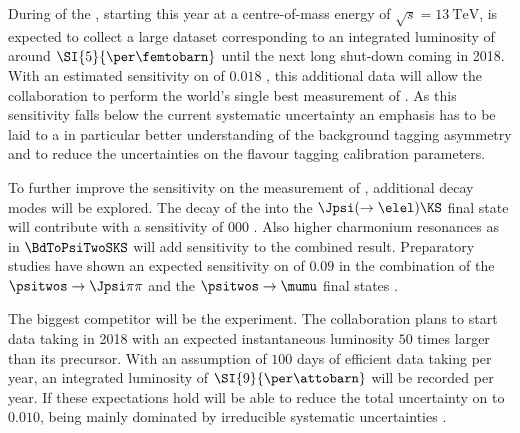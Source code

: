 During \RunTwo of the \LHC, starting this year at a centre-of-mass energy of
$\sqrt{s} = \SI{13}{\TeV}$, \LHCb is expected to collect a large dataset
corresponding to an integrated luminosity of around $\SI{5}{\per\femtobarn}$
until the next long shut-down coming in 2018. With an estimated sensitivity on
\SJpsiKS of $\num{0.018}$ \cite{Moedden:2015}, this additional data will allow
the \LHCb collaboration to perform the world's single best measurement of
\sintwobeta. As this sensitivity falls below the current systematic uncertainty
an emphasis has to be laid to a in particular better understanding of the
background tagging asymmetry and to reduce the uncertainties on the flavour
tagging calibration parameters.

To further improve the sensitivity on the measurement of \sintwobeta, additional
decay modes will be explored. The decay of the \Bd into the $\Jpsi (\to\elel)
\KS$ final state will contribute with a sensitivity of $\num{000}$ \cite{Ramon}.
Also higher charmonium resonances as in $\BdToPsiTwoSKS$ will add sensitivity to
the combined result. Preparatory studies have shown an expected sensitivity on
\sintwobeta of $\num{0.09}$ in the combination of the $\psitwos\to\Jpsi\pi\pi$
and the $\psitwos\to\mumu$ final states \cite{Mueller:2014}.


The biggest competitor will be the \BelleTwo experiment. The collaboration plans
to start data taking in 2018 with an expected instantaneous luminosity
$\num{50}$ times larger than its precursor. With an assumption of $\num{100}$
days of efficient data taking per year, an integrated luminosity of
$\SI{9}{\per\attobarn}$ will be recorded per year. If these expectations hold
\BelleTwo will be able to reduce the total uncertainty on \sintwobeta to
$\num{0.010}$, being mainly dominated by irreducible systematic uncertainties
\cite{Aushev:2010bq}.


